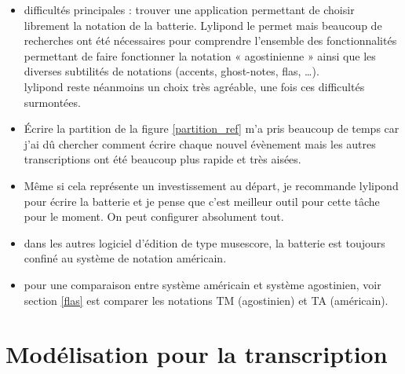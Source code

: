 \begin{itemize}
    \item difficultés principales : trouver une application permettant de
        choisir librement la notation de la batterie. Lylipond le permet mais
        beaucoup de recherches ont été nécessaires pour comprendre l’ensemble
        des fonctionnalités permettant de faire fonctionner la notation
        « agostinienne » ainsi que les diverses subtilités de notations
        (accents, ghost-notes, flas, …).\\
        lylipond reste néanmoins un choix très agréable, une fois ces
        difficultés surmontées.
    \item Écrire la partition de la figure \ref{partition_ref} m’a pris
        beaucoup de temps car j’ai dû chercher comment écrire chaque nouvel
        évènement mais les autres transcriptions ont été beaucoup plus rapide
        et très aisées.
    \item Même si cela représente un investissement au départ, je recommande
        lylipond pour écrire la batterie et je pense que c’est meilleur outil
        pour cette tâche pour le moment. On peut configurer absolument tout.
    \item dans les autres logiciel d’édition de type musescore, la batterie
        est toujours confiné au système de notation américain.
    \item pour une comparaison entre système américain et système agostinien,
        voir section \ref{flas} est comparer les notations TM (agostinien) et
        TA (américain).
\end{itemize}


\section{Modélisation pour la transcription}
\label{modelisation_transcription}
